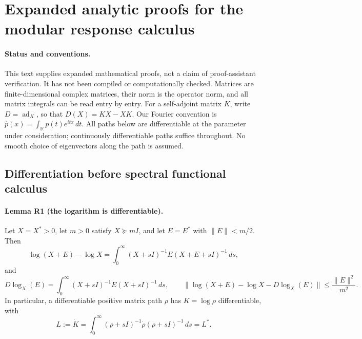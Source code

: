 
\section{Expanded analytic proofs for the modular response calculus}
\label{urgent:response}

\paragraph{Status and conventions.}
This text supplies expanded mathematical proofs, not a claim of
proof-assistant verification. It has not been compiled or computationally
checked. Matrices are finite-dimensional complex matrices, their norm is
the operator norm, and all matrix integrals can be read entry by entry.
For a self-adjoint matrix $K$, write $D=\operatorname{ad}_K$, so that
$D(X)=KX-XK$. Our Fourier convention is
$\widehat p(x)=\int_{\mathbb R}p(t)e^{itx}\,dt$.
All paths below are differentiable at the parameter under consideration;
continuously differentiable paths suffice throughout. No smooth choice of
eigenvectors along the path is assumed.

\subsection{Differentiation before spectral functional calculus}

\paragraph{Lemma R1 (the logarithm is differentiable).}
Let $X=X^*>0$, let $m>0$ satisfy $X\succeq mI$, and let $E=E^*$ with
$\|E\|<m/2$. Then
\[
 \log(X+E)-\log X
 =\int_0^\infty (X+sI)^{-1}E(X+E+sI)^{-1}\,ds,
\]
and
\[
 D\log_X(E)=\int_0^\infty(X+sI)^{-1}E(X+sI)^{-1}\,ds,
 \qquad
 \|\log(X+E)-\log X-D\log_X(E)\|
 \leq \frac{\|E\|^2}{m^2}.
\]
In particular, a differentiable positive matrix path $\rho$ has
$K=\log\rho$ differentiable, with
\[
 L:=\dot K=\int_0^\infty(\rho+sI)^{-1}\dot\rho
                                      (\rho+sI)^{-1}\,ds=L^*.
\]

